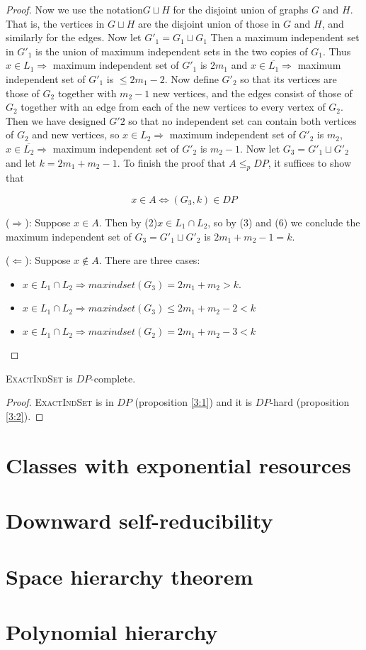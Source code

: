 \begin{proof}
    Now we use the notation$ G\sqcup H$ for the disjoint union of graphs $G$ and $H$. That is, the vertices in $G\sqcup H$ are the disjoint union of those in $G$ and $H$, and similarly for the edges. Now let $G'_1=G_1\sqcup G_1$ Then a maximum independent set in $G'_1$ is the union of maximum independent sets in the two copies of $G_1$. Thus $x\in L_1\Rightarrow$ maximum independent set of $G'_1$ is $2m_1$ and $x\in \overline{L_1} \Rightarrow$ maximum independent set of $G'_1$ is $\leqslant 2m_1-2$. Now define $G'_2$ so that its vertices are those of $G_2$ together with $m_2-1$ new vertices, and the edges consist of those of $G_2$ together with an edge from each of the new vertices to every vertex of $G_2$. Then we have designed $G'2$ so that no independent set can contain both vertices of $G_2$ and new vertices, so $x\in L_2 \Rightarrow$ maximum independent set of $G'_2$ is $m_2$, $x\in \overline{L_2} \Rightarrow$ maximum independent set of $G'_2$ is $m_2-1$. Now let $G_3=G'_1\sqcup G'_2$ and let $k= 2m_1+m_2-1$. To finish the proof that $A\leqslant_p DP$, it suffices to show that 
    
    \begin{lemma}
        $$x\in A\Leftrightarrow(G_3, k)\in DP$$
    \end{lemma}
    
    ($\Rightarrow$): Suppose $x\in A$. Then by (2)$x\in L_1 \cap L_2$, so by (3) and (6) we conclude the maximum independent set of $G_3=G'_1\sqcup  G'_2$ is $2m_1+m_2-1 =k$.
    
    ($\Leftarrow$): Suppose $x \not\in A$. There are three cases:
    \begin{itemize}
        \item $x\in L_1 \cap L_2\Rightarrow maxindset(G_3) = 2m_1+m_2> k$.
        \item $x\in L_1 \cap L_2\Rightarrow maxindset(G_3)\leqslant 2m_1+m_2-2< k$
        \item $x\in L_1 \cap L_2\Rightarrow maxindset(G_2) = 2m_1+m_2-3< k$
    \end{itemize}
\end{proof}

\begin{theoreme}
    \textsc{ExactIndSet} is $DP$-complete.
\end{theoreme}
\begin{proof}
    \textsc{ExactIndSet} is in $DP$ (proposition \ref{3:1}) and it is $DP$-hard (proposition \ref{3:2}).
\end{proof}

\section{Classes with exponential resources}

\section{Downward self-reducibility}

\section{Space hierarchy theorem}

\section{Polynomial hierarchy}




